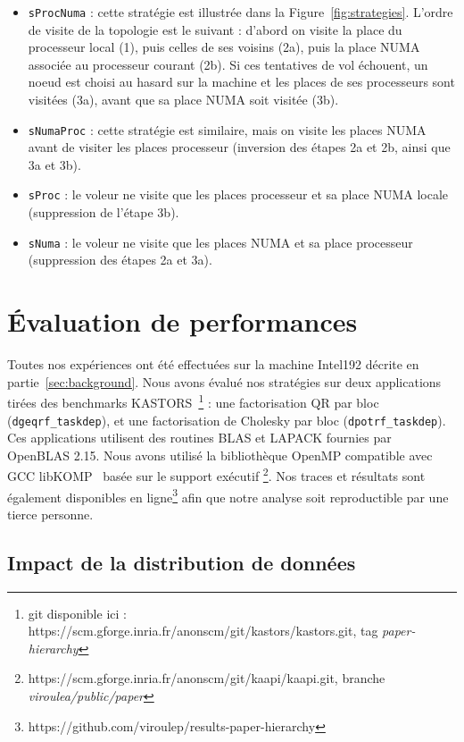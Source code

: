 \documentclass[parallelisme]{compas2016}
\begin{document}
\begin{itemize}
  \item \verb/sProcNuma/ : cette stratégie est illustrée dans la Figure~\ref{fig:strategies}.
    L'ordre de visite de la topologie est le suivant : d'abord on visite la place
    du processeur local (1), puis celles de ses voisins (2a), puis la place NUMA associée au
    processeur courant (2b). Si ces tentatives de vol échouent, un noeud est choisi
    au hasard sur la machine et les places de ses processeurs sont visitées (3a),
    avant que sa place NUMA soit visitée (3b).
    
  \item \verb/sNumaProc/ : cette stratégie est similaire, mais on visite les places
    NUMA avant de visiter les places processeur (inversion des étapes 2a et 2b, ainsi que 3a et 3b).
  \item \verb/sProc/ : le voleur ne visite que les places processeur et sa place
    NUMA locale (suppression de l'étape 3b).
  \item \verb/sNuma/ : le voleur ne visite que les places NUMA et sa place processeur (suppression des étapes 2a et 3a).
\end{itemize}



\section{Évaluation de performances}
\label{sec:performances-evaluation}
Toutes nos expériences ont été effectuées sur la machine Intel192 décrite en partie~\ref{sec:background}.
Nous avons évalué nos stratégies sur deux applications tirées des benchmarks
KASTORS~\cite{virouleau:hal-01081974}\footnote{git disponible ici : https://scm.gforge.inria.fr/anonscm/git/kastors/kastors.git, tag \emph{paper-hierarchy}} :
une factorisation QR par bloc (\verb/dgeqrf_taskdep/), et une factorisation de
Cholesky par bloc (\verb/dpotrf_taskdep/).
Ces applications utilisent des routines BLAS et LAPACK fournies par OpenBLAS 2.15.
Nous avons utilisé la bibliothèque OpenMP compatible avec GCC libKOMP~\cite{libkomp} basée
sur le support exécutif \kaapi\footnote{https://scm.gforge.inria.fr/anonscm/git/kaapi/kaapi.git,
branche \emph{viroulea/public/paper}}.
Nos traces et résultats sont également disponibles en ligne\footnote{https://github.com/viroulep/results-paper-hierarchy} afin que notre analyse
soit reproductible par une tierce personne.


\subsection{Impact de la distribution de données}
\end{document}
